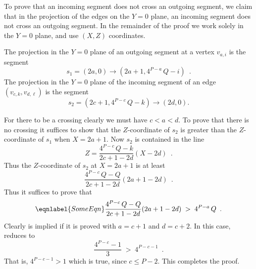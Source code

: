 \documentclass[10pt,twocolumn]{article}
\begin{document}
To prove that an incoming segment does not cross an outgoing segment, we claim
that in the projection of the edges on the $Y=0$ plane,  an incoming segment
does not cross an outgoing segment. In the remainder of the proof we work
solely in the $Y=0$ plane, and use $(X,Z)$ coordinates.

The projection in the $Y=0$ plane 
of an outgoing segment at a vertex $v_{a,i}$  is the segment 
\begin{equation*}
s_1=(2a,0)\rightarrow(2a+1,4^{P-a}\,Q-i)\enspace.
\end{equation*}
The projection in the $Y=0$ plane of the incoming segment of an edge
$(v_{c,k},v_{d,\ell})$  is the segment
\begin{equation*}
s_2=(2c+1,4^{P-c}\,Q-k)\rightarrow(2d,0).
\end{equation*}

For there to be a crossing clearly we must have $c<a<d$. To prove that there is
no crossing it suffices to show that the $Z$-coordinate of $s_2$ is greater
than the $Z$-coordinate of $s_1$ when $X=2a+1$.
Now $s_2$ is contained in the line 
\begin{equation*}
Z=\frac{4^{P-c}\,Q-k}{2c+1-2d}(X-2d)\enspace.
\end{equation*}
Thus the $Z$-coordinate of $s_2$ at $X=2a+1$ is at least
\begin{equation*}
\frac{4^{P-c}\,Q-Q}{2c+1-2d}(2a+1-2d)\enspace.
\end{equation*}
Thus it suffices to prove that 
\begin{equation}
\eqnlabel{SomeEqn}
\frac{4^{P-c}\,Q-Q}{2c+1-2d}(2a+1-2d)\;>\;4^{P-a}\,Q\enspace.
\end{equation}
Clearly  is implied if it is proved with $a=c+1$ and $d=c+2$.
In this case,  reduces to
\begin{equation*}
\frac{4^{P-c}-1}{3}\;>\;4^{P-c-1}\enspace.
\end{equation*}
That is,
$4^{P-c-1}>1$
which is true, since $c\leq P-2$.
This completes the proof.



\end{document}
